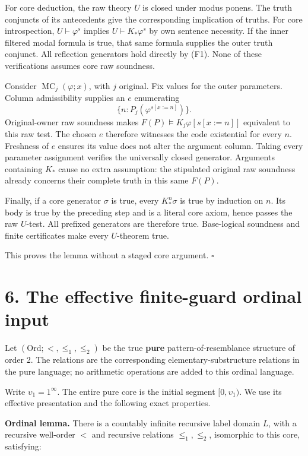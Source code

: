 \documentclass[
  11pt,
  letterpaper,
]{article}
\begin{document}
For core deduction, the raw theory \(U\) is closed under modus ponens.
The truth conjuncts of its antecedents give the corresponding
implication of truths. For core introspection, \(U\vdash\varphi^s\)
implies \(U\vdash K_*\varphi^s\) by own sentence necessity. If the inner
filtered modal formula is true, that same formula supplies the outer
truth conjunct. All reflection generators hold directly by (F1). None of
these verifications assumes core raw soundness.

Consider \(\operatorname{MC}_j(\varphi;x)\), with \(j\) original. Fix
values for the outer parameters. Column admissibility supplies an \(e\)
enumerating \[
\{n:P_j(\varphi^{s[x:=n]})\}.
\] Original-owner raw soundness makes
\(F(P)\models K_j\varphi[s[x:=n]]\) equivalent to this raw test. The
chosen \(e\) therefore witnesses the code existential for every \(n\).
Freshness of \(e\) ensures its value does not alter the argument column.
Taking every parameter assignment verifies the universally closed
generator. Arguments containing \(K_*\) cause no extra assumption: the
stipulated original raw soundness already concerns their complete truth
in this same \(F(P)\).

Finally, if a core generator \(\sigma\) is true, every \(K_*^n\sigma\)
is true by induction on \(n\). Its body is true by the preceding step
and is a literal core axiom, hence passes the raw \(U\)-test. All
prefixed generators are therefore true. Base-logical soundness and
finite certificates make every \(U\)-theorem true.

This proves the lemma without a staged core argument. \(\square\)

\section{6. The effective finite-guard ordinal
input}\label{the-effective-finite-guard-ordinal-input}

Let \((\mathrm{Ord};<,\leq_1,\leq_2)\) be the true \textbf{pure}
pattern-of-resemblance structure of order 2. The relations are the
corresponding elementary-substructure relations in the pure language; no
arithmetic operations are added to this ordinal language.

Write \(\upsilon_1=1^\infty\). The entire pure core is the initial
segment \([0,\upsilon_1)\). We use its effective presentation and the
following exact properties.

\textbf{Ordinal lemma.} There is a countably infinite recursive label
domain \(L\), with a recursive well-order \(<\) and recursive relations
\(\leq_1,\leq_2\), isomorphic to this core, satisfying:
\end{document}
